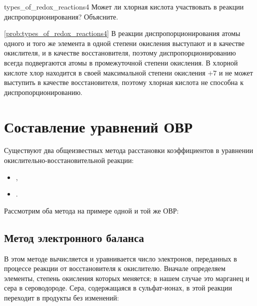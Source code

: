 \begin{problem}{}{types_of_redox_reactions4}
    Может ли хлорная кислота  участвовать в реакции диспропорционирования? Объясните.
    \begin{sol}{\ref{prob:types_of_redox_reactions4}}
        В реакции диспропорционирования атомы одного и того же элемента в одной степени окисления выступают и в качестве окислителя, и в качестве восстановителя, поэтому диспропорционированию всегда подвергаются атомы в промежуточной степени окисления. В хлорной кислоте хлор находится в своей максимальной степени окисления $+7$ и не может выступить в качестве восстановителя, поэтому хлорная кислота не способна к диспропорционированию.
    \end{sol}
\end{problem}

\clearpage

\section{Составление уравнений ОВР}

Существуют два общеизвестных метода расстановки коэффициентов в уравнении окислительно-восстановительной реакции:

\begin{itemize}
    \item {},
    \item {}.
\end{itemize}

Рассмотрим оба метода на примере одной и той же ОВР:


\subsection*{Метод электронного баланса}

В этом методе вычисляется и уравнивается число электронов, переданных в процессе реакции от восстановителя к окислителю. Вначале определяем элементы, степень окисления которых меняется; в нашем случае это марганец и сера в сероводороде. Сера, содержащаяся в сульфат-ионах, в этой реакции переходит в продукты без изменений:


